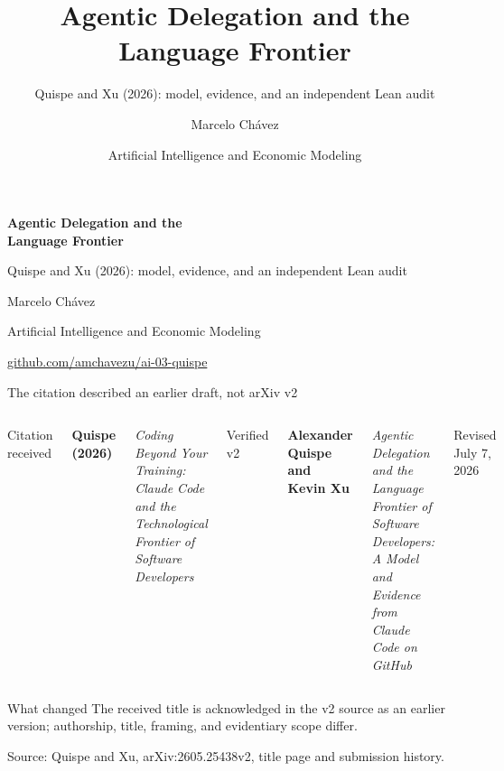 \documentclass[aspectratio=169,11pt]{beamer}
\title{Agentic Delegation and the Language Frontier}
\subtitle{Quispe and Xu (2026): model, evidence, and an independent Lean audit}
\author{Marcelo Chávez}
\date{Artificial Intelligence and Economic Modeling}
\newcommand{\source}[1]{%
  \vfill\par\begingroup\color{gray!75!black}\fontsize{7}{8}\selectfont
  Source: #1\par\endgroup}
\newcommand{\repo}{\href{https://github.com/amchavezu/ai-03-quispe}{github.com/amchavezu/ai-03-quispe}}
\begin{document}
\begin{frame}[plain]
  \color{white}
  \vspace{0.65cm}
  {\fontsize{30}{34}\selectfont\bfseries Agentic Delegation and the\\Language Frontier\par}
  \vspace{0.35cm}
  {\fontsize{16}{19}\selectfont Quispe and Xu (2026): model, evidence, and an independent Lean audit\par}
  \vfill
  {\large Marcelo Chávez}\par
  {\small Artificial Intelligence and Economic Modeling}\par
  \vspace{0.35cm}
  {\small\textcolor{white!85}{\repo}}\par
\end{frame}

\begin{frame}{The citation described an earlier draft, not arXiv v2}
  \begin{columns}[T,onlytextwidth]
      {\color{gray!75!black}\large Citation received}\par\medskip
      \textbf{Quispe (2026)}\par
      \emph{Coding Beyond Your Training: Claude Code and the Technological Frontier of Software Developers}

      \centering\vspace{1.35cm}{\color{Orange}\Huge$\neq$}

      {\color{Teal}\large Verified v2}\par\medskip
      \textbf{Alexander Quispe and Kevin Xu}\par
      \emph{Agentic Delegation and the Language Frontier of Software Developers: A Model and Evidence from Claude Code on GitHub}\par\smallskip
      Revised July 7, 2026
  \end{columns}
  \vspace{0.35cm}
  \begin{block}{What changed}
    The received title is acknowledged in the v2 source as an earlier version; authorship, title, framing, and evidentiary scope differ.
  \end{block}
  \source{Quispe and Xu, arXiv:2605.25438v2, title page and submission history.}
\end{frame}
\end{document}
